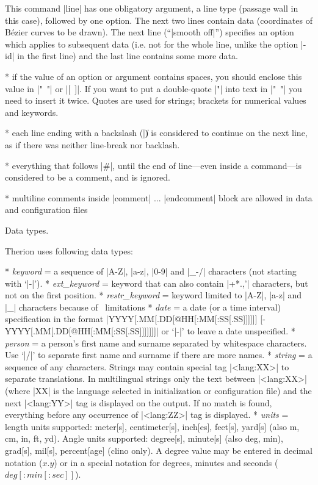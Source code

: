 This command |line| has one obligatory argument, a line type (passage wall in
this case), followed by one option. The next two lines contain data (coordinates of
B\'ezier curves to be drawn). The next line (``|smooth off|'') specifies an option which
applies to subsequent data (i.e. not for the whole line, unlike the option |-id|
in the first line) and the last line contains some more data.

* if the value of an option or argument contains spaces, you should enclose this
  value in \hbox{|" "|} or \hbox{|[ ]|}. If you want to put a double-quote |"| into
  text in \hbox{|" "|} you need to insert it twice. Quotes are used for strings;
  brackets for numerical values and keywords.

* each line ending with a backslash (|\|) is considered to continue on
  the next line, as if there was neither line-break nor backlash.

* everything that follows |#|, until the end of line---even inside a command---is
  considered to be a comment, and is ignored.

* multiline comments inside |comment| ... |endcomment| block are allowed in
  data and configuration files

\endlist


\subchapter Data types.

Therion uses following data types:

\list
* {\it keyword} = a sequence of |A-Z|, |a-z|, |0-9| and |_-/| characters
             (not starting with `|-|').
* {\it ext\_keyword} = keyword that can also contain |+*.,'| characters,
            but not on the first position.
* {\it restr\_keyword} = keyword limited to |A-Z|, |a-z| and |_| characters because
            of \MP\ limitations
* {\it date} = a date (or a time interval) specification in the format\hfil\break
          |YYYY[.MM[.DD[@HH[:MM[:SS[.SS]]]]]] [- YYYY[.MM[.DD[@HH[:MM[:SS[.SS]]]]]]]| or `|-|'
          to leave a date unspecified.
* {\it person} = a person's first name and surname separated by whitespace characters.
            Use `|/|' to separate first name and surname if there are
            more names.
* {\it string} = a sequence of any characters.
    Strings may contain special tag |<lang:XX>| to separate
    translations.
    In multilingual strings only the text between |<lang:XX>|
    (where |XX| is the language selected in initialization
    or configuration file) and the next |<lang:YY>|
    tag is displayed on the output.
    If no match is found, everything before any occurrence of
    |<lang:ZZ>| tag is displayed.
* {\it units} = length units supported:
           meter[s], centimeter[s], inch[es], feet[s], yard[s]
           (also m, cm, in, ft, yd).
           Angle units supported: degree[s], minute[s] (also deg, min),
	   grad[s], mil[s], percent[age] (clino only).
           A degree value may be entered in decimal notation
	   ($x.y$) or in a special notation for degrees, minutes and seconds
	   ($deg[{:}min[{:}sec]]$).
\endlist



